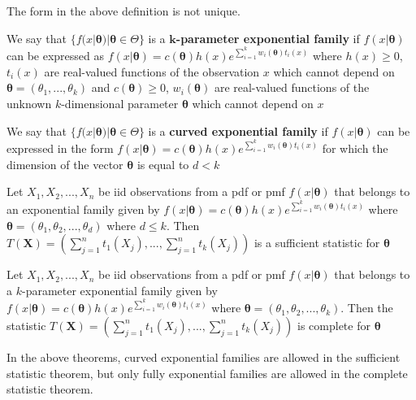 \begin{defn}
    The form in the above definition is not unique.
\end{defn}

\begin{defn}
    We say that $\{ f(x|\bm{\theta}) | \bm{\theta} \in \Theta \}$ is a \textbf{$\bm{k}$-parameter exponential family} if $f(x|\bm{\theta})$ can be expressed as $f(x|\bm{\theta}) = c(\bm{\theta}) h(x) e^{\sum_{i=1}^k w_i(\bm{\theta}) t_i(x)}$ where $h(x) \geq 0$, $t_i (x)$ are real-valued functions of the observation $x$ which cannot depend on $\bm{\theta} = (\theta_1, ..., \theta_k)$ and $c(\bm{\theta}) \geq 0$, $w_i(\bm{\theta})$ are real-valued functions of the unknown $k$-dimensional parameter $\bm{\theta}$ which cannot depend on $x$
\end{defn}

\begin{defn}
    We say that $\{ f(x|\bm{\theta}) | \bm{\theta} \in \Theta \}$ is a \textbf{curved exponential family} if $f(x|\bm{\theta})$ can be expressed in the form $f(x|\bm{\theta}) = c(\bm{\theta}) h(x) e^{\sum_{i=1}^k w_i(\bm{\theta}) t_i(x)}$ for which the dimension of the vector $\bm{\theta}$ is equal to $d < k$
\end{defn}

\begin{thm}
    Let $X_1, X_2, ...,  X_n$ be iid observations from a pdf or pmf $f(x|\bm{\theta})$ that belongs to an exponential family given by $f(x|\bm{\theta}) = c(\bm{\theta}) h(x) e^{\sum_{i=1}^k w_i(\bm{\theta}) t_i(x)}$ where $\bm{\theta} = (\theta_1, \theta_2, ..., \theta_d)$ where $d \leq k$. Then $T(\bm{X}) = \left (  \sum_{j=1}^n t_1(X_j), ..., \sum_{j=1}^n t_k(X_j) \right )$ is a sufficient statistic for $\bm{\theta}$
\end{thm}


\begin{thm}
    Let $X_1, X_2, ..., X_n$ be iid observations from a pdf or pmf $f(x|\bm{\theta})$ that belongs to a $k$-parameter exponential family given by $f(x|\bm{\theta}) = c(\bm{\theta}) h(x) e^{\sum_{i=1}^k w_i(\bm{\theta}) t_i(x)}$  where $\bm{\theta} = (\theta_1, \theta_2, ..., \theta_k)$. Then the statistic $T(\bm{X}) = \left ( \sum_{j=1}^n t_1(X_j), ..., \sum_{j=1}^n t_k(X_j) \right )$ is complete for $\bm{\theta}$
\end{thm}

\begin{note}
    In the above theorems, curved exponential families are allowed in the sufficient statistic theorem, but only fully exponential families are allowed in the complete statistic theorem.
\end{note}


\hhrule
